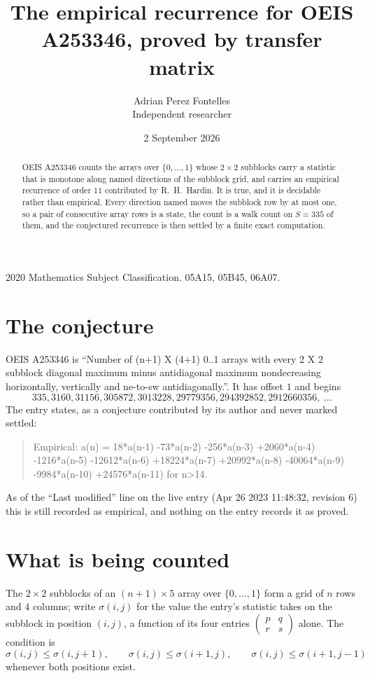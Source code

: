 \documentclass[11pt,a4paper]{article}
\title{The empirical recurrence for OEIS A253346, proved by transfer matrix}
\author{Adrian Perez Fontelles\\ \small Independent researcher}
\date{2 September 2026}
\theoremstyle{plain}
\theoremstyle{definition}
\begin{document}
\maketitle

\begin{abstract}
OEIS A253346 counts the arrays over $\{0,\dots,1\}$ whose $2\times2$ subblocks carry a
statistic that is monotone along named directions of the subblock grid, and carries an
empirical recurrence of order $11$ contributed by R.~H.~Hardin. It is true, and it is
decidable rather than empirical. Every direction named moves the subblock row by at most one,
so a pair of consecutive array rows is a state, the count is a walk count on $S=335$ of them,
and the conjectured recurrence is then settled by a finite exact computation.
\end{abstract}

\noindent\small 2020 Mathematics Subject Classification. 05A15, 05B45, 06A07.\normalsize

\section{The conjecture}

OEIS A253346 is ``Number of (n+1) X (4+1) 0..1 arrays with every 2 X 2 subblock diagonal maximum minus antidiagonal maximum nondecreasing horizontally, vertically and ne-to-sw antidiagonally.''. It has offset $1$ and begins
\[
335, 3160, 31156, 305872, 3013228, 29779356, 294392852, 2912660356,\ \dots
\]
The entry states, as a conjecture contributed by its author and never marked settled:
\begin{quote}
Empirical: a(n) = 18*a(n-1) -73*a(n-2) -256*a(n-3) +2060*a(n-4) -1216*a(n-5) -12612*a(n-6) +18224*a(n-7) +20992*a(n-8) -40064*a(n-9) -9984*a(n-10) +24576*a(n-11) for n>14.
\end{quote}
As of the ``Last modified'' line on the live entry (Apr 26 2023 11:48:32, revision 6) this is still
recorded as empirical, and nothing on the entry records it as proved.

\section{What is being counted}

The $2\times2$ subblocks of an $(n+1)\times5$ array over $\{0,\dots,1\}$ form a grid
of $n$ rows and $4$ columns; write $\sigma(i,j)$ for the value the entry's statistic takes on
the subblock in position $(i,j)$, a function of its four entries
$\begin{pmatrix}p&q\\r&s\end{pmatrix}$ alone. The condition is
\[
\sigma(i,j)\le\sigma(i,j+1),\qquad \sigma(i,j)\le\sigma(i+1,j),\qquad \sigma(i,j)\le\sigma(i+1,j-1)
\]
whenever both positions exist.
\end{document}
